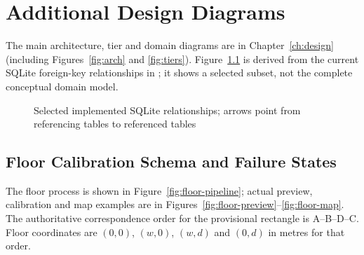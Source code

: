 \chapter{Additional Design Diagrams}
The main architecture, tier and domain diagrams are in Chapter~\ref{ch:design} (including Figures~\ref{fig:arch} and \ref{fig:tiers}). Figure~\ref{fig:implemented-schema} is derived from the current SQLite foreign-key relationships in ; it shows a selected subset, not the complete conceptual domain model.
\begin{figure}[H]
\centering
{}
\caption{Selected implemented SQLite relationships; arrows point from referencing tables to referenced tables}
\label{fig:implemented-schema}
\end{figure}

\section{Floor Calibration Schema and Failure States}
The floor process is shown in Figure~\ref{fig:floor-pipeline}; actual preview, calibration and map examples are in Figures~\ref{fig:floor-preview}--\ref{fig:floor-map}. The authoritative correspondence order for the provisional rectangle is A--B--D--C. Floor coordinates are $(0,0)$, $(w,0)$, $(w,d)$ and $(0,d)$ in metres for that order.

